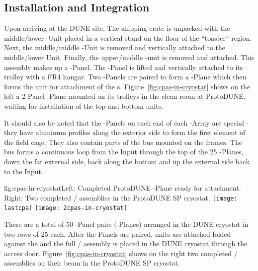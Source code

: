 \subsection{Installation and Integration}
\label{sec:fdsp-hv-integration}
Upon arriving at the DUNE site, The  shipping crate is unpacked with the middle/lower -Unit placed in a vertical stand on the floor of the ``toaster'' region.  Next, the middle/middle -Unit is removed and vertically attached to the middle/lower Unit.  Finally, the upper/middle -unit is removed and attached.  This assembly makes up a -Panel.  The -Panel is lifted and vertically attached to its trolley with a FR4 hangar.  Two -Panels are paired to form a -Plane which then forms the unit for attachment of the s.  Figure~\ref{fig:cpas-in-cryostat} shows on the left a 2-Panel -Plane mounted on its trolleys in the clean room at ProtoDUNE, waiting for installation of the top and bottom  units.

It should also be noted that the -Panels on each end of each -Array are special - they have aluminum profiles along the exterior side to form the first element of the field cage.  They also contain parts of the  bus mounted on the  frames.  The  bus forms a continuous loop from the  Input through the top of the 25 -Planes, down the far external side, back along the bottom and up the  external side back to the  Input.

\begin{dunefigure}{fig:cpas-in-cryostat}{Left: Completed ProtoDUNE -Plane ready for  attachment. Right: Two completed / assemblies in the ProtoDUNE SP cryostat.}
\texttt{[image: lastcpa]}
\texttt{[image: 2cpas-in-cryostat]}
\end{dunefigure}

There are a total of 50 -Panel pairs (-Planes) arranged in the DUNE cryostat in two rows of 25 each.  After the Panels are paired,  units are attached folded against the  and the full / assembly is placed in the DUNE cryostat through the access door.  Figure~\ref{fig:cpas-in-cryostat} shows on the right two completed / assemblies on their beam in the ProtoDUNE SP cryostat.



